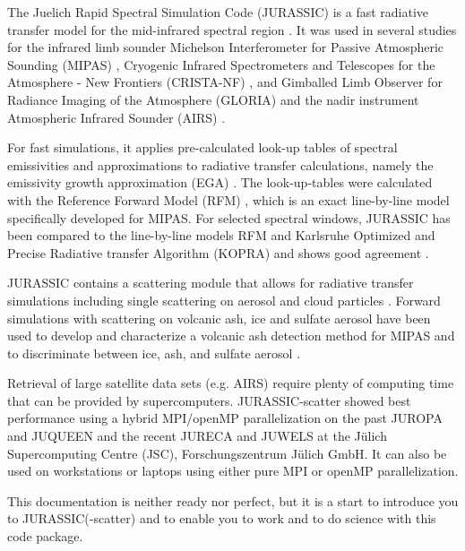 The Juelich Rapid Spectral Simulation Code (JURASSIC) is a fast radiative transfer model for the mid-infrared spectral region \citep{Hoffmann2006}. It was used in several studies for the infrared limb sounder Michelson Interferometer for Passive Atmospheric Sounding (MIPAS) \citep{Hoffmann2005, Hoffmann2008}, Cryogenic Infrared Spectrometers and Telescopes for the Atmosphere - New Frontiers (CRISTA-NF) \citep{Hoffmann2009, Weigel2010}, and Gimballed Limb Observer for Radiance Imaging of the Atmosphere (GLORIA) \citep{Ungermann2010a} and the nadir instrument Atmospheric Infrared Sounder (AIRS) \citep{Hoffmann2009b, Grimsdell2010,Hoffmann2013}.

For fast simulations, it applies pre-calculated look-up tables of spectral emissivities and approximations to radiative transfer calculations, namely the emissivity growth approximation (EGA) \citep{Weinreb1973,Gordley1981,Marshall1994}.%
The look-up-tables were calculated with the Reference Forward Model (RFM) \citep{Dudhia2002,Dudhia2014,Dudhia2017}, which is an exact line-by-line model specifically developed for MIPAS. For selected spectral windows, JURASSIC has been compared to the line-by-line models RFM and Karlsruhe Optimized and Precise Radiative transfer Algorithm (KOPRA) \citep{Stiller2000,Stiller2002,Hoepfner2005} and shows good agreement \citep{Griessbach2013}.

JURASSIC contains a scattering module that allows for radiative transfer simulations including single scattering on aerosol and cloud particles \citep{Griessbach2012,Griessbach2013}. Forward simulations with scattering on volcanic ash, ice and sulfate aerosol have been used to develop and characterize a volcanic ash detection method for MIPAS \citep{Griessbach2012a,Griessbach2014} and to discriminate between ice, ash, and sulfate aerosol \citep{Griessbach2016,Griessbach2018}.

Retrieval of large satellite data sets (e.g. AIRS) require plenty of computing time that can be provided by supercomputers. JURASSIC-scatter showed best performance using a hybrid MPI/openMP parallelization on the past JUROPA and JUQUEEN and the recent JURECA and JUWELS at the Jülich Supercomputing Centre (JSC), Forschungszentrum Jülich GmbH. It can also be used on workstations or laptops using either pure MPI or openMP parallelization.

This documentation is neither ready nor perfect, but it is a start to introduce you to JURASSIC(-scatter) and to enable you to work and to do science with this code package.